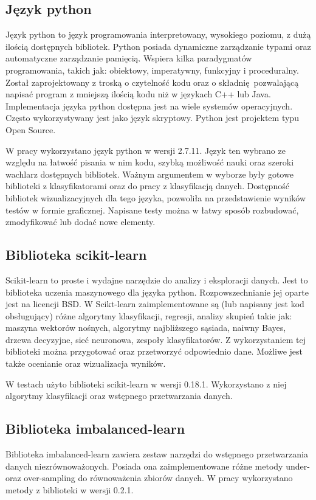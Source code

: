 \subsection{Język python}
Język python to język programowania interpretowany, wysokiego poziomu, z dużą ilością dostępnych bibliotek. Python\cite{python} posiada dynamiczne zarządzanie typami oraz automatyczne zarządzanie pamięcią. Wspiera kilka paradygmatów programowania, takich jak: obiektowy, imperatywny, funkcyjny i proceduralny. Został zaprojektowany z troską o czytelność kodu oraz o składnię pozwalającą napisać program z mniejszą ilością kodu niż w językach C++ lub Java. Implementacja języka python dostępna jest na wiele systemów operacyjnych. Często wykorzystywany jest jako język skryptowy. Python jest projektem typu Open Source. \par
W pracy wykorzystano język python w wersji 2.7.11. Język ten wybrano ze względu na łatwość pisania w nim kodu, szybką możliwość nauki oraz szeroki wachlarz dostępnych bibliotek. Ważnym argumentem w wyborze były gotowe biblioteki z klasyfikatorami oraz do pracy z klasyfikacją danych. Dostępność bibliotek wizualizacyjnych dla tego języka, pozwoliła na przedstawienie wyników testów w formie graficznej. Napisane testy można w łatwy sposób rozbudować, zmodyfikować lub dodać nowe elementy.    

\subsection{Biblioteka scikit-learn}
Scikit-learn\cite{scikit} to proste i wydajne narzędzie do analizy i eksploracji danych. Jest to biblioteka uczenia maszynowego dla języka python. Rozpowszechnianie jej oparte jest na licencji BSD. W Scikt-learn zaimplementowane są (lub napisany jest kod obsługujący) różne algorytmy klasyfikacji, regresji, analizy skupień takie jak: maszyna wektorów nośnych, algorytmy najbliższego sąsiada, naiwny Bayes, drzewa decyzyjne, sieć neuronowa, zespoły klasyfikatorów. Z wykorzystaniem tej biblioteki można przygotować oraz przetworzyć odpowiednio dane. Możliwe jest także ocenianie oraz wizualizacja wyników. \par
W testach użyto biblioteki scikit-learn w wersji 0.18.1. Wykorzystano z niej algorytmy klasyfikacji oraz wstępnego przetwarzania danych.
\subsection{Biblioteka imbalanced-learn}
Biblioteka imbalanced-learn\cite{imlearn} zawiera zestaw narzędzi do wstępnego przetwarzania danych niezrównoważonych. Posiada ona zaimplementowane różne metody under- oraz over-sampling do równoważenia zbiorów danych. W pracy wykorzystano metody z biblioteki w wersji 0.2.1. 
